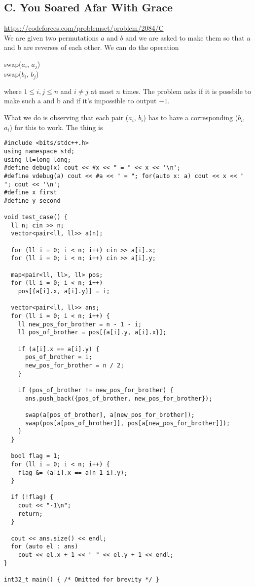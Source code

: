\subsection{C. You Soared Afar With Grace}
\url{https://codeforces.com/problemset/problem/2084/C} \\

We are given two permutations $a$ and $b$ and we are asked to make them so that a and b are reverses of each other. We can do the operation
\begin{center}
    swap($a_i$, $a_j$) \\
    swap($b_i$, $b_j$)
\end{center}
where $1 \leq i,j \leq n$ and $i \neq j$ at most $n$ times. The problem asks if it is possbile to make such a and b and if it's impossible to output $-1$.

What we do is observing that each pair ($a_i$, $b_i$) has to have a corresponding ($b_i$, $a_i$) for this to work. The thing is 

\begin{verbatim}
#include <bits/stdc++.h>
using namespace std;
using ll=long long;
#define debug(x) cout << #x << " = " << x << '\n';
#define vdebug(a) cout << #a << " = "; for(auto x: a) cout << x << " "; cout << '\n';
#define x first
#define y second

void test_case() {
  ll n; cin >> n;
  vector<pair<ll, ll>> a(n);

  for (ll i = 0; i < n; i++) cin >> a[i].x;
  for (ll i = 0; i < n; i++) cin >> a[i].y;

  map<pair<ll, ll>, ll> pos;
  for (ll i = 0; i < n; i++) 
    pos[{a[i].x, a[i].y}] = i;

  vector<pair<ll, ll>> ans;
  for (ll i = 0; i < n; i++) {
    ll new_pos_for_brother = n - 1 - i; 
    ll pos_of_brother = pos[{a[i].y, a[i].x}];

    if (a[i].x == a[i].y) {
      pos_of_brother = i;
      new_pos_for_brother = n / 2;
    }
    
    if (pos_of_brother != new_pos_for_brother) {
      ans.push_back({pos_of_brother, new_pos_for_brother});

      swap(a[pos_of_brother], a[new_pos_for_brother]);
      swap(pos[a[pos_of_brother]], pos[a[new_pos_for_brother]]);
    }
  }
  
  bool flag = 1;
  for (ll i = 0; i < n; i++) {
    flag &= (a[i].x == a[n-1-i].y);
  }

  if (!flag) {
    cout << "-1\n";
    return;
  }

  cout << ans.size() << endl;
  for (auto el : ans) 
    cout << el.x + 1 << " " << el.y + 1 << endl;
}

int32_t main() { /* Omitted for brevity */ }
\end{verbatim}

